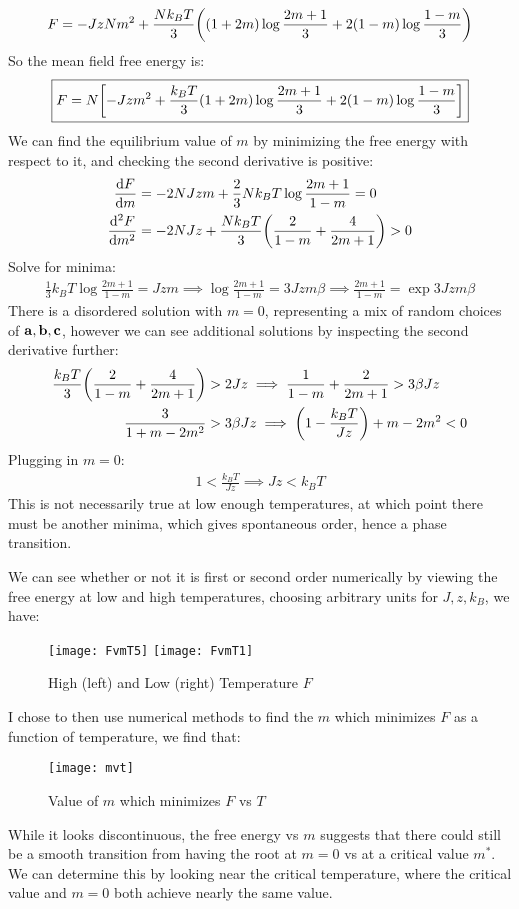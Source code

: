 \begin{align*}
  F&=-JzNm^2+
  \frac{Nk_BT}{3}\qty((1+2m)\log\frac{2m+1}{3}+2(1-m)\log\frac{1-m}{3})\\
\end{align*}
So the mean field free energy is:
\begin{equation}
  \boxed{F=N\qty[-Jzm^2+\frac{k_BT}{3}
    \qty(1+2m)\log\frac{2m+1}{3}+2(1-m)\log\frac{1-m}3]}
\end{equation}
We can find the equilibrium value of $m$ by minimizing the free energy with respect to it, and checking the second derivative is positive:
\begin{align*}
  \dv{F}{m}&=-2NJzm+\frac23Nk_BT\log\frac{2m+1}{1-m}=0\\
  \dv[2]{F}{m}&=-2NJz+\frac{Nk_BT}{3}\qty(\frac2{1-m}+\frac4{2m+1})>0
\end{align*}
Solve for minima:
\begin{align*}
  \frac13k_BT\log\frac{2m+1}{1-m}=Jzm\implies
  \log\frac{2m+1}{1-m}=3Jzm\beta\implies
  \frac{2m+1}{1-m}=\exp{3Jzm\beta}
\end{align*}
There is a disordered solution with $m=0$, representing a mix of random choices of $\vb{a,b,c}$, however we can see additional solutions by inspecting the second derivative further:
\begin{align*}
  \frac{k_BT}{3}\qty(\frac2{1-m}+\frac4{2m+1})&>2Jz\implies
  \frac1{1-m}+\frac2{2m+1}>3\beta Jz\\
  \frac3{1+m-2m^2}&>3\beta Jz\implies
  \qty(1-\frac{k_BT}{Jz})+m-2m^2<0
\end{align*}
Plugging in $m=0$:
\begin{align*}
  1<\frac{k_BT}{Jz}\implies Jz<k_BT
\end{align*}
This is not necessarily true at low enough temperatures, at which point there must be another minima, which gives spontaneous order, hence a phase transition.

We can see whether or not it is first or second order numerically by viewing the free energy at low and high temperatures, choosing arbitrary units for $J,z,k_B$, we have:
\begin{figure}[H]
  \centering
  \texttt{[image: FvmT5]}
  \texttt{[image: FvmT1]}
  \caption{High (left) and Low (right) Temperature $F$}
\end{figure}
I chose to then use numerical methods to find the $m$ which minimizes $F$ as a function of temperature, we find that:
\begin{figure}[H]
  \centering
  \texttt{[image: mvt]}
  \caption{Value of $m$ which minimizes $F$ vs $T$}
\end{figure}
While it looks discontinuous, the free energy vs $m$ suggests that there could still be a smooth transition from having the root at $m=0$ vs at a critical value $m^*$. We can determine this by looking near the critical temperature, where the critical value and $m=0$ both achieve nearly the same value.

